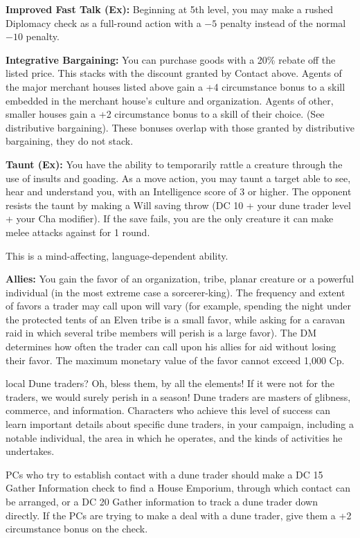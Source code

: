 {\textbf{Improved Fast Talk (Ex):} Beginning at 5th level, you may make a rushed Diplomacy check as a full-round action with a $-5$ penalty instead of the normal $-10$ penalty.

\textbf{Integrative Bargaining:} You can purchase goods with a 20\% rebate off the listed price. This stacks with the discount granted by Contact above. Agents of the major merchant houses listed above gain a +4 circumstance bonus to a skill embedded in the merchant house's culture and organization. Agents of other, smaller houses gain a +2 circumstance bonus to a skill of their choice. (See distributive bargaining). These bonuses overlap with those granted by distributive bargaining, they do not stack.

\textbf{Taunt (Ex):} You have the ability to temporarily rattle a creature through the use of insults and goading. As a move action, you may taunt a target able to see, hear and understand you, with an Intelligence score of 3 or higher. The opponent resists the taunt by making a Will saving throw (DC 10 + your dune trader level + your Cha modifier). If the save fails, you are the only creature it can make melee attacks against for 1 round.

This is a mind-affecting, language-dependent ability.

\textbf{Allies:} You gain the favor of an organization, tribe, planar creature or a powerful individual (in the most extreme case a sorcerer-king). The frequency and extent of favors a trader may call upon will vary (for example, spending the night under the protected tents of an Elven tribe is a small favor, while asking for a caravan raid in which several tribe members will perish is a large favor). The DM determines how often the trader can call upon his allies for aid without losing their favor. The maximum monetary value of the favor cannot exceed 1,000 Cp.
}
{}
{local}
{Dune traders? Oh, bless them, by all the elements! If it were not for the traders, we would surely perish in a season!}
{Dune traders are masters of glibness, commerce, and information.}
{Characters who achieve this level of success can learn important details about specific dune traders, in your campaign, including a notable individual, the area in which he operates, and the kinds of activities he undertakes.}

PCs who try to establish contact with a dune trader should make a DC 15 Gather Information check to find a House Emporium, through which contact can be arranged, or a DC 20 Gather information to track a dune trader down directly. If the PCs are trying to make a deal with a dune trader, give them a +2 circumstance bonus on the check.